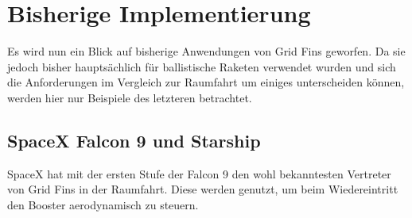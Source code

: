 \section{Bisherige Implementierung}
Es wird nun ein Blick auf bisherige Anwendungen von Grid Fins geworfen. Da sie jedoch bisher hauptsächlich für ballistische Raketen verwendet wurden und sich die Anforderungen im Vergleich zur Raumfahrt um einiges unterscheiden können, werden hier nur Beispiele des letzteren betrachtet.
\subsection{SpaceX Falcon 9 und Starship}
SpaceX hat mit der ersten Stufe der Falcon 9 den wohl bekanntesten Vertreter von Grid Fins in der Raumfahrt. Diese werden genutzt, um beim Wiedereintritt den Booster aerodynamisch zu steuern. 

